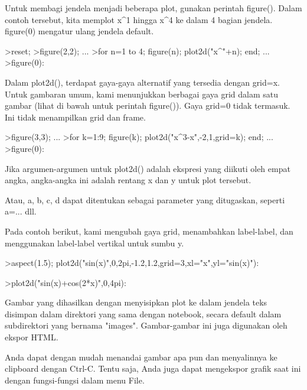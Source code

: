 \documentclass[a4paper,10pt]{article}
\begin{document}
\begin{eulernotebook}
\begin{eulercomment}
\begin{eulercomment}
\begin{eulercomment}
\begin{eulercomment}
\begin{eulercomment}
\begin{eulercomment}
\begin{eulercomment}
Untuk membagi jendela menjadi beberapa plot, gunakan perintah
figure(). Dalam contoh tersebut, kita memplot x\textasciicircum{}1 hingga x\textasciicircum{}4 ke dalam
4 bagian jendela. figure(0) mengatur ulang jendela default.
\end{eulercomment}
\begin{eulerprompt}
>reset;
>figure(2,2); ...
>for n=1 to 4; figure(n); plot2d("x^"+n); end; ...
>figure(0):
\end{eulerprompt}
\begin{eulercomment}
Dalam plot2d(), terdapat gaya-gaya alternatif yang tersedia dengan
grid=x. Untuk gambaran umum, kami menunjukkan berbagai gaya grid dalam
satu gambar (lihat di bawah untuk perintah figure()). Gaya grid=0
tidak termasuk. Ini tidak menampilkan grid dan frame.
\end{eulercomment}
\begin{eulerprompt}
>figure(3,3); ...
>for k=1:9; figure(k); plot2d("x^3-x",-2,1,grid=k); end; ...
>figure(0):
\end{eulerprompt}
\begin{eulercomment}
Jika argumen-argumen untuk plot2d() adalah ekspresi yang diikuti oleh
empat angka, angka-angka ini adalah rentang x dan y untuk plot
tersebut.

Atau, a, b, c, d dapat ditentukan sebagai parameter yang ditugaskan,
seperti a=... dll.

Pada contoh berikut, kami mengubah gaya grid, menambahkan label-label,
dan menggunakan label-label vertikal untuk sumbu y.
\end{eulercomment}
\begin{eulerprompt}
>aspect(1.5); plot2d("sin(x)",0,2pi,-1.2,1.2,grid=3,xl="x",yl="sin(x)"):
\end{eulerprompt}
\begin{eulerprompt}
>plot2d("sin(x)+cos(2*x)",0,4pi):
\end{eulerprompt}
\begin{eulercomment}
Gambar yang dihasilkan dengan menyisipkan plot ke dalam jendela teks
disimpan dalam direktori yang sama dengan notebook, secara default
dalam subdirektori yang bernama "images". Gambar-gambar ini juga
digunakan oleh ekspor HTML.

Anda dapat dengan mudah menandai gambar apa pun dan menyalinnya ke
clipboard dengan Ctrl-C. Tentu saja, Anda juga dapat mengekspor grafik
saat ini dengan fungsi-fungsi dalam menu File.


\end{eulercomment}
\end{eulercomment}
\end{eulercomment}
\end{eulercomment}
\end{eulercomment}
\end{eulercomment}
\end{eulercomment}
\end{eulernotebook}
\end{document}
